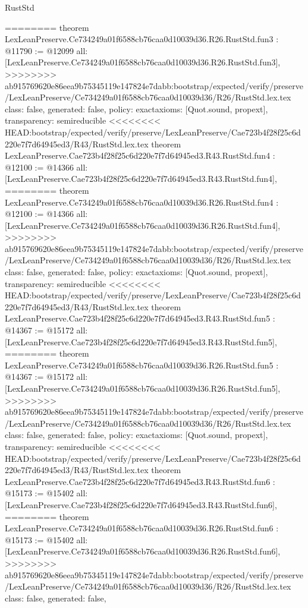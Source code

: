 \begin{lexlean}{RustStd}
\begin{coremodule}
{\begin{coremodule}
{{{{{{========
theorem LexLeanPreserve.Ce734249a01f6588cb76caa0d10039d36.R26.RustStd.fun3 : @11790 := @12099 {
  all: [LexLeanPreserve.Ce734249a01f6588cb76caa0d10039d36.R26.RustStd.fun3],
>>>>>>>> ab915769620e86eea9b75345119e147824e7dabb:bootstrap/expected/verify/preserve/LexLeanPreserve/Ce734249a01f6588cb76caa0d10039d36/R26/RustStd.lex.tex
  class: false,
  generated: false,
  policy: exact{axioms: [Quot.sound, propext]},
  transparency: semireducible
}
<<<<<<<< HEAD:bootstrap/expected/verify/preserve/LexLeanPreserve/Cae723b4f28f25c6d220e7f7d64945ed3/R43/RustStd.lex.tex
theorem LexLeanPreserve.Cae723b4f28f25c6d220e7f7d64945ed3.R43.RustStd.fun4 : @12100 := @14366 {
  all: [LexLeanPreserve.Cae723b4f28f25c6d220e7f7d64945ed3.R43.RustStd.fun4],
========
theorem LexLeanPreserve.Ce734249a01f6588cb76caa0d10039d36.R26.RustStd.fun4 : @12100 := @14366 {
  all: [LexLeanPreserve.Ce734249a01f6588cb76caa0d10039d36.R26.RustStd.fun4],
>>>>>>>> ab915769620e86eea9b75345119e147824e7dabb:bootstrap/expected/verify/preserve/LexLeanPreserve/Ce734249a01f6588cb76caa0d10039d36/R26/RustStd.lex.tex
  class: false,
  generated: false,
  policy: exact{axioms: [Quot.sound, propext]},
  transparency: semireducible
}
<<<<<<<< HEAD:bootstrap/expected/verify/preserve/LexLeanPreserve/Cae723b4f28f25c6d220e7f7d64945ed3/R43/RustStd.lex.tex
theorem LexLeanPreserve.Cae723b4f28f25c6d220e7f7d64945ed3.R43.RustStd.fun5 : @14367 := @15172 {
  all: [LexLeanPreserve.Cae723b4f28f25c6d220e7f7d64945ed3.R43.RustStd.fun5],
========
theorem LexLeanPreserve.Ce734249a01f6588cb76caa0d10039d36.R26.RustStd.fun5 : @14367 := @15172 {
  all: [LexLeanPreserve.Ce734249a01f6588cb76caa0d10039d36.R26.RustStd.fun5],
>>>>>>>> ab915769620e86eea9b75345119e147824e7dabb:bootstrap/expected/verify/preserve/LexLeanPreserve/Ce734249a01f6588cb76caa0d10039d36/R26/RustStd.lex.tex
  class: false,
  generated: false,
  policy: exact{axioms: [Quot.sound, propext]},
  transparency: semireducible
}
<<<<<<<< HEAD:bootstrap/expected/verify/preserve/LexLeanPreserve/Cae723b4f28f25c6d220e7f7d64945ed3/R43/RustStd.lex.tex
theorem LexLeanPreserve.Cae723b4f28f25c6d220e7f7d64945ed3.R43.RustStd.fun6 : @15173 := @15402 {
  all: [LexLeanPreserve.Cae723b4f28f25c6d220e7f7d64945ed3.R43.RustStd.fun6],
========
theorem LexLeanPreserve.Ce734249a01f6588cb76caa0d10039d36.R26.RustStd.fun6 : @15173 := @15402 {
  all: [LexLeanPreserve.Ce734249a01f6588cb76caa0d10039d36.R26.RustStd.fun6],
>>>>>>>> ab915769620e86eea9b75345119e147824e7dabb:bootstrap/expected/verify/preserve/LexLeanPreserve/Ce734249a01f6588cb76caa0d10039d36/R26/RustStd.lex.tex
  class: false,
  generated: false,
}}}}}}}}}}
\end{coremodule}}
\end{coremodule}
\end{lexlean}
